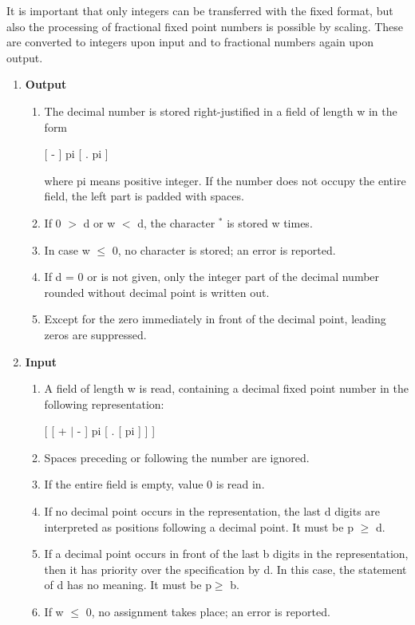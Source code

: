 \begin{removed}
It is important that only integers can be transferred with the fixed
format, but also the processing of fractional fixed point numbers is
possible by scaling. These are converted to integers upon input and to
fractional numbers again upon output.

\begin{enumerate}
\item {\bf Output}
\begin{enumerate}
\item The decimal number is stored right-justified in a field of length
w in the form

[ - ] pi [ . pi ]

where pi means positive integer. If the number does not occupy the
entire field, the left part is padded with spaces.
\item If 0 $>$ d or w $<$ d, the character $^*$ is stored w times.
\item In case w $\leq$ 0, no character is stored; an error is reported.
\item If d = 0 or is not given, only the integer part of the decimal
number rounded without decimal point is written out.
\item Except for the zero immediately in front of the decimal point,
leading zeros are suppressed.
\end{enumerate}
\item {\bf Input}
\begin{enumerate}
\item A field of length w is read, containing a decimal fixed point
number in the following representation:

[ [ + $\mid$ - ] pi [ . [ pi ] ] ]

\item Spaces preceding or following the number are ignored.
\item If the entire field is empty, value 0 is read in.
\item If no decimal point occurs in the representation, the last d
digits are interpreted as positions following a decimal point. It must
be p $\geq$ d.
\item If a decimal point occurs in front of the last b digits in the
representation, then it has priority over the specification by d. In
this case, the statement of d has no meaning. It must be p$\geq$ b.
\item If w $\leq$ 0, no assignment takes place; an error is reported.
\end{enumerate}
\end{enumerate}


\end{removed}
